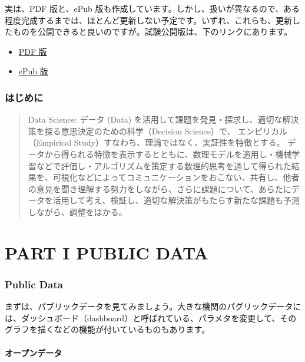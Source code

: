 \documentclass[
]{bxjsbook}
\providecommand{\tightlist}{%
  \setlength{\itemsep}{0pt}\setlength{\parskip}{0pt}}
\theoremstyle{definition}
\theoremstyle{definition}
\theoremstyle{definition}
\theoremstyle{definition}
\theoremstyle{remark}
\begin{document}
実は、PDF 版と、ePub 版も作成しています。しかし、扱いが異なるので、ある程度完成するまでは、ほとんど更新しない予定です。いずれ、これらも、更新したものを公開できると良いのですが。試験公開版は、下のリンクにあります。

\begin{itemize}
\tightlist
\item
  \href{https://icu-hsuzuki.github.io/ds4aj/ds4aj.pdf}{PDF 版}
\item
  \href{https://icu-hsuzuki.github.io/ds4aj/ds4aj.epub}{ePub 版}
\end{itemize}

\hypertarget{introduction}{%
\section{はじめに}\label{introduction}}

\begin{quote}
Data Science: データ (Data) を活用して課題を発見・探求し、適切な解決策を探る意思決定のための科学（Decision Science）で、 エンピリカル（Empirical Study）すなわち、理論ではなく、実証性を特徴とする。 データから得られる特徴を表示するとともに、数理モデルを適用し・機械学習などで評価し・アルゴリズムを策定する数理的思考を通して得られた結果を、可視化などによってコミュニケーションをおこない、共有し、他者の意見を聞き理解する努力をしながら、さらに課題について、あらたにデータを活用して考え、検証し、適切な解決策がもたらす新たな課題も予測しながら、調整をはかる。
\end{quote}

\hypertarget{part-part-i-public-data}{%
\part{PART I PUBLIC DATA}\label{part-part-i-public-data}}

\hypertarget{publicdata}{%
\section{Public Data}\label{publicdata}}

まずは、パブリックデータを見てみましょう。大きな機関のパグリックデータには、ダッシュボード（dashboard）と呼ばれている、パラメタを変更して、そのグラフを描くなどの機能が付いているものもあります。

\hypertarget{ux30aaux30fcux30d7ux30f3ux30c7ux30fcux30bf}{%
\subsection{オープンデータ}\label{ux30aaux30fcux30d7ux30f3ux30c7ux30fcux30bf}}
\end{document}
